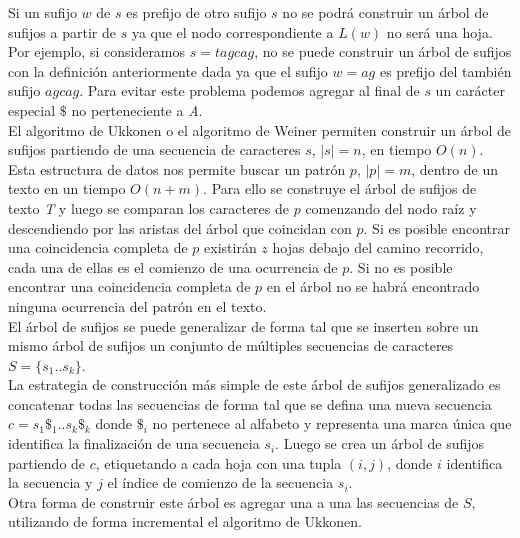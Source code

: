 Si un sufijo $w$ de $s$ es prefijo de otro sufijo $s$ no se podrá construir un árbol de sufijos a partir de $s$ ya que el nodo correspondiente a $L(w)$ no será una hoja. Por ejemplo, si consideramos $s=tagcag$, no se puede construir un árbol de sufijos con la definición anteriormente dada ya que el sufijo $w=ag$ es prefijo del también sufijo $agcag$. Para evitar este problema podemos agregar al final de $s$ un carácter especial $\$$ no perteneciente a {\it A}.\\
El algoritmo de Ukkonen \cite{UK95} o el algoritmo de Weiner \cite{WEINER} permiten construir un árbol de sufijos partiendo de una secuencia de caracteres $s$, $\mid s \mid =n$, en tiempo $O(n)$.\\
Esta estructura de datos nos permite buscar un patrón $p$, $\mid p \mid = m$, dentro de un texto en un tiempo $O(n+m)$. Para ello se construye el árbol de sufijos de texto {\it T} y luego se comparan los caracteres de $p$ comenzando del nodo raíz y descendiendo por las aristas del árbol que coincidan con $p$. Si es posible encontrar una coincidencia completa de $p$ existirán $z$ hojas debajo del camino recorrido, cada una de ellas es el comienzo de una ocurrencia de $p$. Si no es posible encontrar una coincidencia completa de $p$ en el árbol no se habrá encontrado ninguna ocurrencia del patrón en el texto.\\
El árbol de sufijos se puede generalizar de forma tal que se inserten sobre un mismo árbol de sufijos un conjunto de múltiples secuencias de caracteres $S=\{s_{1}..s_{k}\}$.\\
La estrategia de construcción más simple de este árbol de sufijos generalizado es concatenar todas las secuencias de forma tal que se defina una nueva secuencia $c=s_{1}\$_{1}..s_{k}\$_{k}$ donde $\$_{i}$ no pertenece al alfabeto y representa una marca única que identifica la finalización de una secuencia $s_{i}$. Luego se crea un árbol de sufijos partiendo de $c$, etiquetando a cada hoja con una tupla $(i,j)$, donde $i$ identifica la secuencia y $j$ el índice de comienzo de la secuencia $s_{i}$.\\
Otra forma de construir este árbol es agregar una a una las secuencias de $S$, utilizando de forma incremental el algoritmo de Ukkonen.
